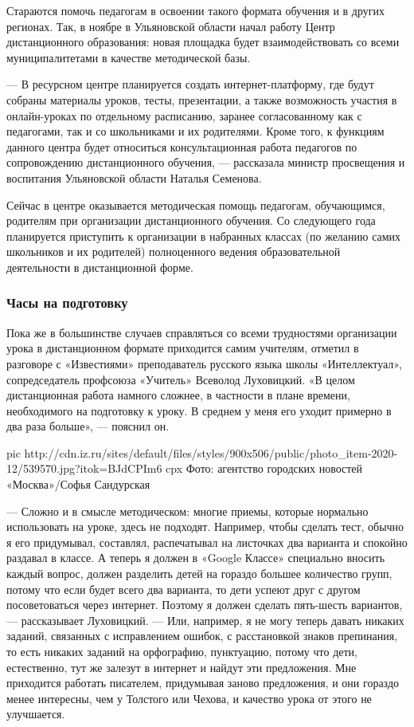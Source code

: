 Стараются помочь педагогам в освоении такого формата обучения и в других
регионах. Так, в ноябре в Ульяновской области начал работу Центр дистанционного
образования: новая площадка будет взаимодействовать со всеми муниципалитетами в
качестве методической базы.

— В ресурсном центре планируется создать интернет-платформу, где будут собраны
материалы уроков, тесты, презентации, а также возможность участия в
онлайн-уроках по отдельному расписанию, заранее согласованному как с
педагогами, так и со школьниками и их родителями. Кроме того, к функциям
данного центра будет относиться консультационная работа педагогов по
сопровождению дистанционного обучения, — рассказала министр просвещения и
воспитания Ульяновской области Наталья Семенова.

Сейчас в центре оказывается методическая помощь педагогам, обучающимся,
родителям при организации дистанционного обучения. Со следующего года
планируется приступить к организации в набранных классах (по желанию самих
школьников и их родителей) полноценного ведения образовательной деятельности в
дистанционной форме.

\subsubsection{Часы на подготовку}

Пока же в большинстве случаев справляться со всеми трудностями организации
урока в дистанционном формате приходится самим учителям, отметил в разговоре с
«Известиями» преподаватель русского языка школы «Интеллектуал», сопредседатель
профсоюза «Учитель» Всеволод Луховицкий. «В целом дистанционная работа намного
сложнее, в частности в плане времени, необходимого на подготовку к уроку. В
среднем у меня его уходит примерно в два раза больше», — пояснил он.

\ifcmt
pic http://cdn.iz.ru/sites/default/files/styles/900x506/public/photo_item-2020-12/539570.jpg?itok=BJdCPIm6
cpx Фото: агентство городских новостей «Москва»/Софья Сандурская
\fi

— Сложно и в смысле методическом: многие приемы, которые нормально использовать
на уроке, здесь не подходят. Например, чтобы сделать тест, обычно я его
придумывал, составлял, распечатывал на листочках два варианта и спокойно
раздавал в классе. А теперь я должен в «Google Классе» специально вносить
каждый вопрос, должен разделить детей на гораздо большее количество групп,
потому что если будет всего два варианта, то дети успеют друг с другом
посоветоваться через интернет. Поэтому я должен сделать пять-шесть вариантов, —
рассказывает Луховицкий. — Или, например, я не могу теперь давать никаких
заданий, связанных с исправлением ошибок, с расстановкой знаков препинания, то
есть никаких заданий на орфографию, пунктуацию, потому что дети, естественно,
тут же залезут в интернет и найдут эти предложения. Мне приходится работать
писателем, придумывая заново предложения, и они гораздо менее интересны, чем у
Толстого или Чехова, и качество урока от этого не улучшается.

